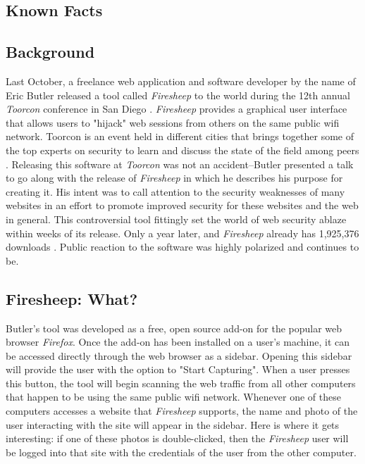 \documentclass[11pt]{article}
\begin{document}
\begin{multicols}{2}
\setcounter{page}{1}

\section{Known Facts}
\subsection{Background}
Last October, a freelance web application and software developer by the name of Eric Butler released a tool called \emph{Firesheep} to the world during the 12th annual \emph{Toorcon} conference in San Diego \cite{codebutler_main}. \emph{Firesheep} provides a graphical user interface that allows users to "hijack" web sessions from others on the same public wifi network. Toorcon is an event held in different cities that brings together some of the top experts on security to learn and discuss the state of the field among peers \cite{toorcon}. Releasing this software at \emph{Toorcon} was not an accident--Butler presented a talk to go along with the release of \emph{Firesheep} in which he describes his purpose for creating it. His intent was to call attention to the security weaknesses of many websites in an effort to promote improved security for these websites and the web in general. This controversial tool fittingly set the world of web security ablaze within weeks of its release. Only a year later, and \emph{Firesheep} already has 1,925,376 downloads \cite{github}. Public reaction to the software was highly polarized and continues to be.

\subsection{Firesheep: What?}
Butler's tool was developed as a free, open source add-on for the popular web browser \emph{Firefox}. Once the add-on has been installed on a user's machine, it can be accessed directly through the web browser as a sidebar. Opening this sidebar will provide the user with the option to "Start Capturing". When a user presses this button, the tool will begin scanning the web traffic from all other computers that happen to be using the same public wifi network. Whenever one of these computers accesses a website that \emph{Firesheep} supports, the name and photo of the user interacting with the site will appear in the sidebar. Here is where it gets interesting: if one of these photos is double-clicked, then the \emph{Firesheep} user will be logged into that site with the credentials of the user from the other computer. \cite{codebutler_main}


\end{multicols}
\end{document}
